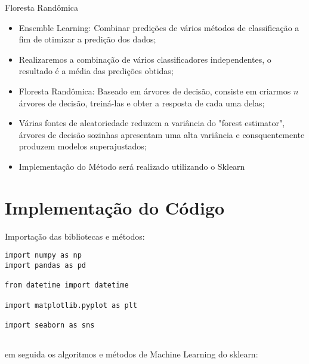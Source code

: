 \documentclass[compress]{beamer}
\begin{document}
\begin{frame}{Floresta Randômica}
\begin{itemize}
    \item Ensemble Learning: Combinar predições de vários métodos de classificação a fim de otimizar a predição dos dados;
    \item Realizaremos a combinação de vários classificadores independentes, o resultado é a média das predições obtidas;
    \item Floresta Randômica: Baseado em árvores de decisão, consiste em criarmos $n$ árvores de decisão, treiná-las e obter a resposta de cada uma delas;
    \item Várias fontes de aleatoriedade reduzem a variância do "forest estimator", árvores de decisão sozinhas apresentam uma alta variância e consquentemente produzem modelos superajustados;
\end{itemize}
    
\end{frame}


\begin{frame}{}
    \begin{itemize}
        \item Implementação do Método será realizado utilizando o Sklearn \cite{scikit-learn}
    \end{itemize}
\end{frame}

\section{Implementação do Código}

Importação das bibliotecas e métodos:

\begin{verbatim}
import numpy as np
import pandas as pd

from datetime import datetime

import matplotlib.pyplot as plt

import seaborn as sns


\end{verbatim}

em seguida os algoritmos e métodos de Machine Learning do sklearn:
\end{document}
